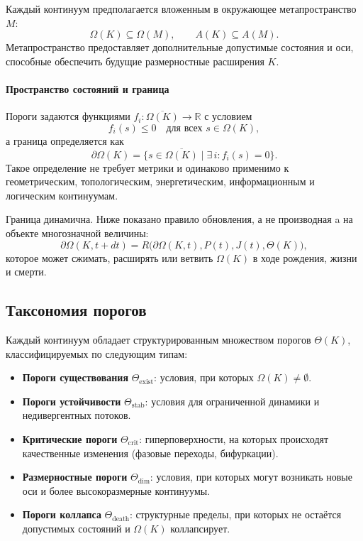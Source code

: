 Каждый континуум предполагается вложенным в окружающее метапространство \(M\):
\[
    \Omega(K)\subseteq\Omega(M), \qquad A(K)\subseteq A(M).
\]
Метапространство предоставляет дополнительные допустимые состояния и оси, способные
обеспечить будущие размерностные расширения \(K\).

\paragraph{Пространство состояний и граница}
Пороги задаются функциями \(f_i : \overline{\Omega(K)} \to \mathbb{R}\) с условием
\[
    f_i(s) \le 0 \quad\text{для всех } s \in \Omega(K),
\]
а граница определяется как
\[
    \partial\Omega(K) = \{ s \in \overline{\Omega(K)} \mid \exists\, i: f_i(s) = 0 \}.
\]
Такое определение не требует метрики и одинаково применимо к геометрическим,
топологическим, энергетическим, информационным и логическим континуумам.

Граница динамична. Ниже показано правило обновления, а не производная
a на объекте многозначной величины:
\[
    \partial\Omega(K,t+dt) =
    R\big(\partial\Omega(K,t),P(t),J(t),\Theta(K)\big),
\]
которое может сжимать, расширять или ветвить \(\Omega(K)\) в ходе рождения, жизни и смерти.

\subsection{Таксономия порогов}

Каждый континуум обладает структурированным множеством порогов \(\Theta(K)\),
классифицируемых по следующим типам:

\begin{itemize}
    \item \textbf{Пороги существования} \(\Theta_{\mathrm{exist}}\): условия, при которых \(\Omega(K)\neq\emptyset\).
    \item \textbf{Пороги устойчивости} \(\Theta_{\mathrm{stab}}\): условия для ограниченной динамики и недивергентных потоков.
    \item \textbf{Критические пороги} \(\Theta_{\mathrm{crit}}\): гиперповерхности, на которых происходят качественные изменения (фазовые переходы, бифуркации).
    \item \textbf{Размерностные пороги} \(\Theta_{\mathrm{dim}}\): условия, при которых могут возникать новые оси и более высокоразмерные континуумы.
    \item \textbf{Пороги коллапса} \(\Theta_{\mathrm{death}}\): структурные пределы, при которых не остаётся допустимых состояний и \(\Omega(K)\) коллапсирует.
\end{itemize}

